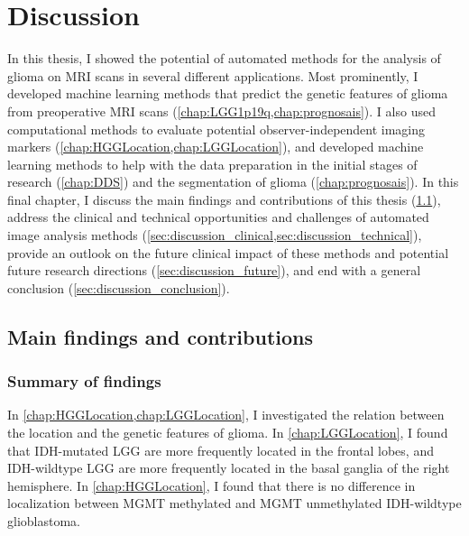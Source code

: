
\chapter{Discussion}\label{chap:discussion}
\begin{ChapterAbstractNoTitle}
\end{ChapterAbstractNoTitle}
In this thesis, I showed the potential of automated methods for the analysis of glioma on \gls{MRI} scans in several different applications.
Most prominently, I developed machine learning methods that predict the genetic features of glioma from preoperative \gls{MRI} scans (\cref{chap:LGG1p19q,chap:prognosais}).
I also used computational methods to evaluate potential observer-independent imaging markers (\cref{chap:HGGLocation,chap:LGGLocation}), and developed machine learning methods to help with the data preparation in the initial stages of research (\cref{chap:DDS}) and the segmentation of glioma (\cref{chap:prognosais}).
In this final chapter, I discuss the main findings and contributions of this thesis (\cref{sec:discussion_main_findings}), address the clinical and technical opportunities and challenges of automated image analysis methods (\cref{sec:discussion_clinical,sec:discussion_technical}), provide an outlook on the future clinical impact of these methods and potential future research directions (\cref{sec:discussion_future}), and end with a general conclusion (\cref{sec:discussion_conclusion}).

\section{Main findings and contributions}\label{sec:discussion_main_findings}

\subsection{Summary of findings}

In \cref{chap:HGGLocation,chap:LGGLocation}, I investigated the relation between the location and the genetic features of \gls{glioma}.
In \cref{chap:LGGLocation}, I found that \gls{IDH}-mutated \gls{LGG} are more frequently located in the frontal lobes, and \gls{IDH}-wildtype \gls{LGG} are more frequently located in the basal ganglia of the right hemisphere.
In \cref{chap:HGGLocation}, I found that there is no difference in localization between \gls{MGMT} methylated and \gls{MGMT} unmethylated \gls{IDH}-wildtype glioblastoma.


